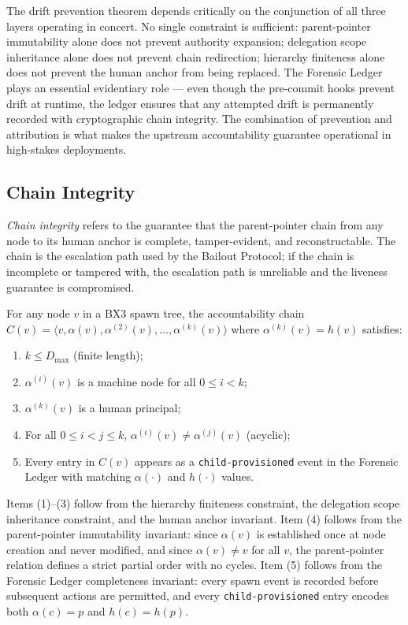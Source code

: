 The drift prevention theorem depends critically on the conjunction of all three
layers operating in concert. No single constraint is sufficient: parent-pointer
immutability alone does not prevent authority expansion; delegation scope
inheritance alone does not prevent chain redirection; hierarchy finiteness
alone does not prevent the human anchor from being replaced. The Forensic Ledger
plays an essential evidentiary role — even though the pre-commit hooks prevent
drift at runtime, the ledger ensures that any attempted drift is permanently
recorded with cryptographic chain integrity. The combination of prevention and
attribution is what makes the upstream accountability guarantee operational in
high-stakes deployments.

\subsection{Chain Integrity}
\label{sec:chain-integrity}

\textit{Chain integrity} refers to the guarantee that the parent-pointer chain
from any node to its human anchor is complete, tamper-evident, and
reconstructable. The chain is the escalation path used by the Bailout Protocol;
if the chain is incomplete or tampered with, the escalation path is unreliable
and the liveness guarantee is compromised.

\begin{property}
\label{prop:chain-integrity}
For any node $v$ in a BX3 spawn tree, the accountability chain
$C(v) = \langle v, \alpha(v), \alpha^{(2)}(v), \ldots, \alpha^{(k)}(v) \rangle$
where $\alpha^{(k)}(v) = h(v)$ satisfies:
\begin{enumerate}
\item $k \leq D_{\max}$ (finite length);
\item $\alpha^{(i)}(v)$ is a machine node for all $0 \leq i < k$;
\item $\alpha^{(k)}(v)$ is a human principal;
\item For all $0 \leq i < j \leq k$, $\alpha^{(i)}(v) \neq \alpha^{(j)}(v)$ (acyclic);
\item Every entry in $C(v)$ appears as a \texttt{child-provisioned} event in the
Forensic Ledger with matching $\alpha(\cdot)$ and $h(\cdot)$ values.
\end{enumerate}
\end{property}

Items (1)–(3) follow from the hierarchy finiteness constraint, the delegation
scope inheritance constraint, and the human anchor invariant. Item (4) follows
from the parent-pointer immutability invariant: since $\alpha(v)$ is established
once at node creation and never modified, and since $\alpha(v) \neq v$ for all
$v$, the parent-pointer relation defines a strict partial order with no cycles.
Item (5) follows from the Forensic Ledger completeness invariant: every spawn
event is recorded before subsequent actions are permitted, and every
\texttt{child-provisioned} entry encodes both $\alpha(c) = p$ and $h(c) = h(p)$.

